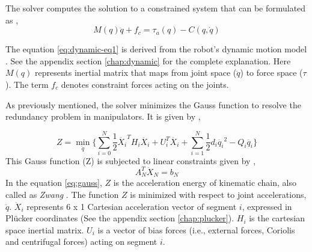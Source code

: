  The solver computes the solution to a constrained system that can be formulated as \cite{shakhimardanov2015composable}, 
 \begin{equation}\label{eq:dynamic-eq1}
		 M(q)\ddot{q} + f_c = \tau_a(q) - C(q, \dot{q})
 \end{equation}
 
 
 The equation \ref{eq:dynamic-eq1} is derived from the robot's dynamic motion model \cite{shakhimardanov2015composable}. See the appendix section \autoref{chap:dynamic} for the complete explanation.
 Here $M(q)$ represents inertial matrix that maps from joint space ($\ddot{q}$) to force space ($\tau$). The term  $f_c$ denotes constraint forces acting on the joints.
 
As previously mentioned, the solver minimizes the Gauss function to resolve the redundancy problem in manipulators. It is given by \cite{vereshchagin1989modeling}, 

 


% 
 \begin{equation} \label{eq:gauss}
	Z = \min_{\ddot{q}} \Big \{\sum_{i=0}^{N} \frac{1}{2} \ddot{X_i}^T H_i \ddot{X_i} + U_i^T\ddot{X_i} + \sum_{i=1}^{N} \frac{1}{2} d_i \ddot{q_i}^2 - Q_i \ddot{q_i} \Big \}
 \end{equation} 
 This Gauss function (Z) is subjected to linear constraints given by \cite{shakhimardanov2015composable},
 \begin{equation} \label{eq:constraint}
	 A_N^T \ddot{X}_N = b_N
 \end{equation} 
 In the equation \ref{eq:gauss},  $Z$ is the acceleration energy of kinematic chain, also called as \textit{Zwang} \cite{shakhimardanov2015composable}.  The function $Z$ is minimized with respect to joint accelerations, $\ddot{q}$. $\ddot{X}_i$ represents 6 x 1 Cartesian acceleration vector of segment $i$, expressed in Pl{\"u}cker coordinates (See the appendix section \autoref{chap:plucker}). $H_i$ is the cartesian space inertial matrix. $U_i$ is a vector of bias forces (i.e., external forces, Coriolis and centrifugal forces) acting on segment $i$. 
 
